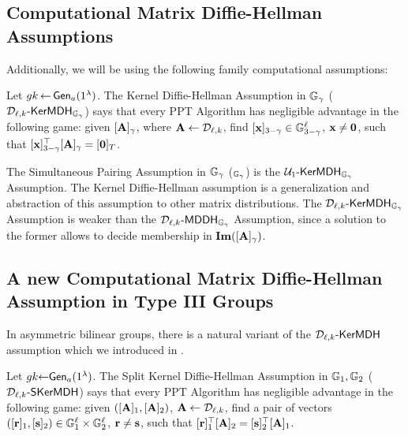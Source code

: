 \subsection{Computational Matrix Diffie-Hellman Assumptions}
Additionally, we will be using the following family  computational assumptions:
\begin{definition}Let  ${gk} 
\hspace*{-1pt}
\gets
\hspace*{-1pt}
\mathsf{Gen}_a(1^\lambda)$.
The Kernel Diffie-Hellman Assumption in $\mathbb{G}_\gamma$  ($\mathcal{D}_{\ell,k}\mbox{-}\mathsf{KerMDH}_{\mathbb{G}_\gamma}$) says that every PPT Algorithm has negligible advantage in the following  game: given $[\mathbf{{A}}]_\gamma$, where $\mathbf{{A}} \gets \mathcal{D}_{\ell,k}$, find $[\mathbf{x}]_{3-\gamma} \in \mathbb{G}_{3-\gamma}^{\ell}$, $\mathbf{x} \neq \mathbf{0}$, such that 
$[\mathbf{x}]_{3-\gamma}^{\top}[\mathbf{{A}}]_{\gamma}=[\mathbf{0}]_T$. 
\end{definition}
The  Simultaneous Pairing Assumption in $\mathbb{G}_\gamma$  (\SP$_{\mathbb{G}_{\gamma}}$) is the $ \mathcal{U}_1\mbox{-}\mathsf{KerMDH}_{\mathbb{G}_{\gamma}}$ Assumption. The Kernel Diffie-Hellman assumption is a generalization and abstraction of this assumption to other matrix distributions. 
The $\mathcal{D}_{\ell,k}\mbox{-}\mathsf{KerMDH}_{\mathbb{G}_{\gamma}}$ Assumption is weaker than the $\mathcal{D}_{\ell,k}\mbox{-}\mathsf{MDDH}_{\mathbb{G}_{\gamma}}$ Assumption, since a solution to the former allows to decide membership in $\mathbf{Im}([\mathbf{{A}}]_{\gamma})$.

\subsection{A new Computational Matrix Diffie-Hellman Assumption in Type III Groups}

In asymmetric bilinear groups, there is a natural variant of the $\mathcal{D}_{\ell,k}\mbox{-}\mathsf{KerMDH}$ assumption which we introduced in \cite{AC:GonHevRaf15}.  
\begin{definition}
Let  ${gk} \hspace*{-3pt} \gets
\hspace*{-3pt}
\mathsf{Gen}_a(1^\lambda)$.
The Split Kernel Diffie-Hellman Assumption in $\mathbb{G}_1,\mathbb{G}_2$  ($\mathcal{D}_{\ell,k}\mbox{-}\mathsf{SKerMDH}$) says that every PPT Algorithm has negligible advantage in the following  game: given $([\mathbf{{A}}]_1,[\mathbf{{A}}]_2)$, $\mathbf{{A}} \leftarrow \mathcal{D}_{\ell,k}$, find a pair of vectors $([\mathbf{r}]_1,[\mathbf{s}]_2) \in \mathbb{G}_1^{\ell} \times \mathbb{G}_2^{\ell}$, $\mathbf{r} \neq \mathbf{s}$, such that 
$[\mathbf{r}]_1^{\top}[\mathbf{{A}}]_2=[\mathbf{s}]_2^{\top}[\mathbf{{A}}]_1$. 
\end{definition}

